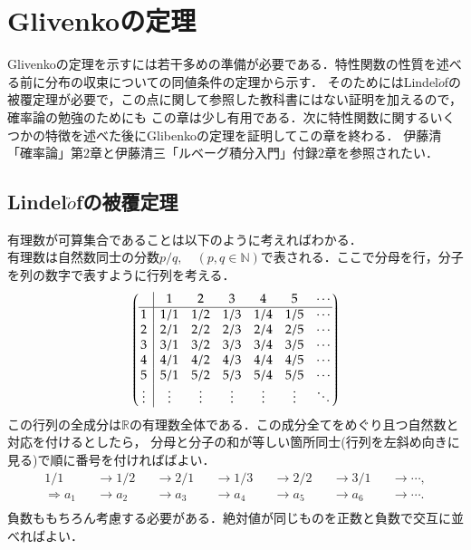 \documentclass[a4j,papersize,disablejfam,slide,14pt]{jsarticle}
\begin{document}
\section{{\rm Glivenko}の定理}
\label{sec:glivenko_theorem}
	{\rm Glivenko}の定理を示すには若干多めの準備が必要である．特性関数の性質を述べる前に分布の収束についての同値条件の定理から示す．
    そのためには{\rm Lindel$\ddot{o}$f}の被覆定理が必要で，この点に関して参照した教科書にはない証明を加えるので，確率論の勉強のためにも
    この章は少し有用である．次に特性関数に関するいくつかの特徴を述べた後に{\rm Glibenko}の定理を証明してこの章を終わる．
    伊藤清「確率論」第$2$章と伊藤清三「ルベーグ積分入門」付録$2$章を参照されたい．
\subsection{{\rm Lindel$\ddot{o}$f}の被覆定理}
	有理数が可算集合であることは以下のように考えればわかる．\\
    有理数は自然数同士の分数$p/q,\quad (p,q \in \mathbb{N})$で表される．ここで分母を行，分子を列の数字で表すように行列を考える．
    \begin{align}
    \arraycolsep5pt
    	\left(
    	\begin{array}{@{\,}c|cccccc@{\,}}
    		&1&2&3&4&5&\cdots\\
    		\hline
    		1&1/1&1/2&1/3&1/4&1/5&\cdots\\
    		2&2/1&2/2&2/3&2/4&2/5&\cdots\\
    		3&3/1&3/2&3/3&3/4&3/5&\cdots\\
    		4&4/1&4/2&4/3&4/4&4/5&\cdots\\
    		5&5/1&5/2&5/3&5/4&5/5&\cdots\\
    		\vdots&\vdots&\vdots&\vdots&\vdots&\vdots&\ddots\\
    	\end{array}
    	\right)
    \end{align}
    この行列の全成分は$\mathbb{R}$の有理数全体である．この成分全てをめぐり且つ自然数と対応を付けるとしたら，
    分母と分子の和が等しい箇所同士(行列を左斜め向きに見る)で順に番号を付ければばよい．
    \begin{align}
    	1/1 &&\to 1/2 &&\to 2/1 &&\to 1/3 &&\to 2/2 &&\to 3/1 &&\to \cdots, \\
        \Rightarrow a_1 &&\to a_2 &&\to a_3 &&\to a_4 &&\to a_5 &&\to a_6 &&\to \cdots. \\
    \end{align}
    負数ももちろん考慮する必要がある．絶対値が同じものを正数と負数で交互に並べればよい．
\end{document}
